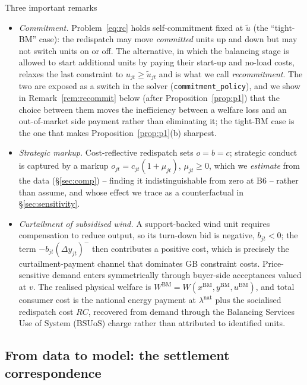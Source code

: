 \documentclass[review,3p,times]{elsarticle}
\theoremstyle{plain}
\theoremstyle{definition}
\begin{document}
Three important remarks
\begin{itemize} 
\item[(i)]\emph{Commitment.} Problem~\eqref{eq:rc} holds
self-commitment fixed at $\tilde u$ (the ``tight-BM'' case): the redispatch may
move \emph{committed} units up and down but may not switch units on or off. The
alternative, in which the balancing stage is allowed to start additional units by
paying their start-up and no-load costs, relaxes the last constraint to
$u_{jt}\ge\tilde u_{jt}$ and is what we call \emph{recommitment}. The two are
exposed as a switch in the solver (\texttt{commitment\_policy}), and we show in
Remark~\ref{rem:recommit} below (after Proposition~\ref{prop:p1}) that the choice
between them moves the inefficiency between a welfare loss and an out-of-market
side payment rather than eliminating it; the tight-BM case is the one that makes
Proposition~\ref{prop:p1}(b) sharpest.

\item[(ii)]\emph{ Strategic
markup.} Cost-reflective redispatch sets $o=b=c$; strategic conduct is captured
by a markup $o_{jt}=c_{jt}(1+\mu_{jt})$, $\mu_{jt}\ge 0$, which we \emph{estimate}
from the data (\S\ref{sec:comp}) -- finding it indistinguishable from zero at B6 --
rather than assume, and whose effect we trace as a counterfactual in
\S\ref{sec:sensitivity}.

\item[(iii)]\emph{Curtailment of subsidised wind.} A
support-backed wind unit requires compensation to reduce output, so its
turn-down bid is negative, $b_{jt}<0$; the term $-b_{jt}(\Delta y_{jt})^{-}$ then
contributes a positive cost, which is precisely the curtailment-payment channel
that dominates GB constraint costs. Price-sensitive demand enters symmetrically
through buyer-side acceptances valued at $v$. The realised physical welfare is
$W^{\mathrm{BM}}=W(x^{\mathrm{BM}},y^{\mathrm{BM}},u^{\mathrm{BM}})$, and total
consumer cost is the national energy payment at $\lambda^{\mathrm{nat}}$ plus the
socialised redispatch cost $RC$, recovered from demand through the
Balancing Services Use of System (BSUoS) charge rather than attributed to
identified units.

\end{itemize}

\subsection{From data to model: the settlement correspondence}
\label{sec:corr}
\end{document}
